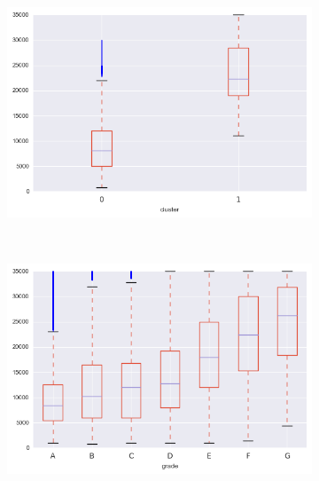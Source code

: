 \begin{apendicesenv}
\begin{figure}[t!]
    \centering
        \caption{funded\textunderscore amnt\textunderscore inv }
    	\begin{subfigure}[t]{0.5\textwidth}
 
			\centerline{\includegraphics[width=1\textwidth]{img/funded_amnt_inv_by_cluster}}
    	\end{subfigure}%
    	~ 
    	\begin{subfigure}[t]{0.5\textwidth}
 			\centerline{\includegraphics[width=1\textwidth]{img/funded_amnt_inv_by_grade}}

    	\end{subfigure}
    	\\
    	        \caption{installment}
    	\begin{subfigure}[t]{0.5\textwidth}
    		\centering


\end{subfigure}
\end{figure}
\end{apendicesenv}
